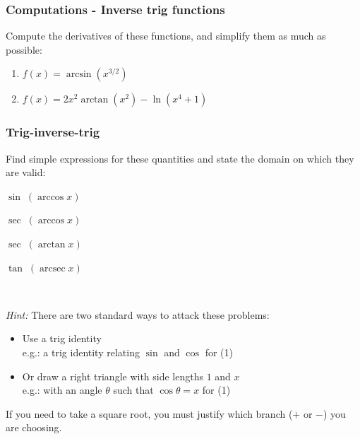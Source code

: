 \begin{frame}[t]
	\frametitle{Computations - Inverse trig functions}

	Compute the derivatives of these functions, and simplify them as much as possible:
	\begin{enumerate}
		\item $\displaystyle f(x) = \arcsin \left( x^{3/2}\right)$
			\vfill

		\item $\displaystyle f(x)=2x^{2}\arctan (x^{2}) - \ln (x^{4}+1)$
			\vfill
	\end{enumerate}
\end{frame}

\begin{frame}[t]
	\frametitle{Trig-inverse-trig}

	\begin{block}{}
		Find simple expressions for these quantities and state the domain on which they
		are valid:
		\begin{enumerate}
		\end{enumerate}
		\vspace{-.1cm}
	\end{block}

	\

	{\fontsize{13}{13}\selectfont \emph{Hint:} There are two standard ways to attack these problems: \begin{itemize}\item Use a trig identity \\ e.g.: a trig identity relating $\sin$ and $\cos$ for (1)

	\item Or draw a right triangle with side lengths $1$ and $x$ \\ e.g.: with an angle $\theta$ such that $\cos \theta = x$ for (1)\end{itemize} If you need to take a square root, you must justify which branch ($+$ or $-$) you are choosing. }
\end{frame}

